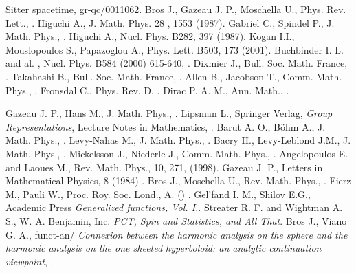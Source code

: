 \documentclass[a4paper,11pt,showpacs,preprintnumbers]{revtex4}
\begin{document}
\begin{thebibliography}{99}
{Sitter spacetime}, gr-qc/0011062.
 Bros J., Gazeau J. P., Moschella U.,
Phys. Rev. Lett., \coordHE{}.
 Higuchi A.,  J. Math. Phys. 28 , 1553
(1987).
 Gabriel C., Spindel P., J. Math. Phys.,
\coordHE{}.
 Higuchi A.,  Nucl. Phys. B282, 397
(1987).
  Kogan I.I., Mouslopoulos S.,
Papazoglou A., Phys. Lett. B503, 173 (2001).
 Buchbinder I. L. and al. , Nucl. Phys.
B584 (2000) 615-640, \coordHE{}.
 Dixmier J., Bull. Soc. Math. France, \coordHE{}.
 Takahashi B., Bull. Soc. Math. France, \coordHE{}.
 Allen B., Jacobson T., Comm.
Math. Phys., \coordHE{}.
 Fronsdal C., Phys. Rev. D, \coordHE{}.
 Dirac P. A. M., Ann.  Math., \coordHE{}.

 Gazeau J. P.,  Hans M., J. Math. Phys.,
\coordHE{}.
 Lipsman L., Springer Verlag, {\it Group
Representations}, Lecture Notes in Mathematics, \coordHE{}.
 Barut A. O., B\"ohm  A., J. Math.
Phys., \coordHE{}.
 Levy-Nahas M., J. Math.
Phys., \coordHE{}.
 Bacry H., Levy-Leblond J.M., J. Math.
Phys., \coordHE{}.
 Mickelsson J., Niederle J., Comm.
Math. Phys., \coordHE{}.
  Angelopoulos E. and Laoues M.,
Rev.  Math. Phys., 10, 271, (1998).
 Gazeau J. P., Letters in Mathematical Physics, 8
(1984) \coordHE{}.
 Bros J., Moschella U., Rev. Math.
Phys., \coordHE{}.
 Fierz M.,  Pauli W., Proc. Roy. Soc. Lond.,
 A\coordHE{}. (\coordHE{}) \coordHE{}.
 Gel'fand I. M., Shilov E.G., Academic
Press \coordHE{} {\it  Generalized functions, Vol. I.}.
 Streater R. F. and Wightman A. S., W.
A. Benjamin, Inc. \coordHE{}  {\it PCT, Spin and Statistics, and All
That}.
 Bros J., Viano G. A., funct-an/\coordHE{} {\it Connexion between the harmonic analysis
on the sphere and the harmonic analysis on the one sheeted
hyperboloid: an analytic continuation viewpoint}, \coordHE{}.

\end{thebibliography}
\end{document}
